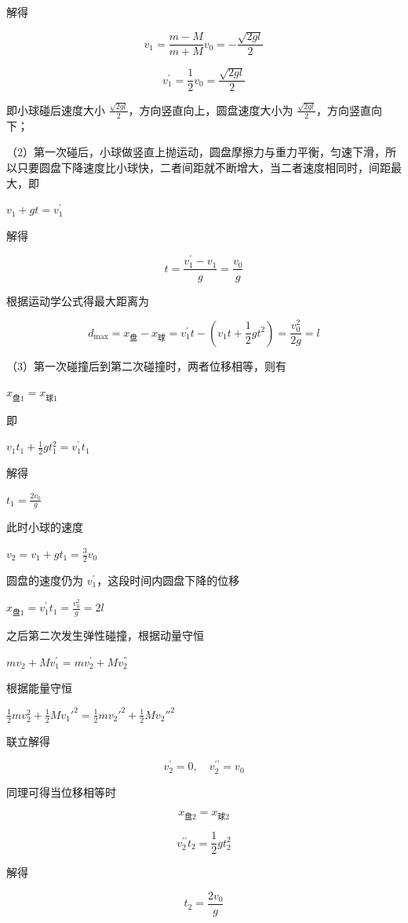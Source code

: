 \documentclass[\gkver]{gaokaozhenti}
\begin{document}
\begin{enumerate}
{解得

$$ v_{1}=\frac{m-M}{m+M}v_{0}=-\frac{\sqrt{2gl}}{2} $$

$$ v_{1}^{\prime}=\frac{1}{2}v_{0}=\frac{\sqrt{2gl}}{2} $$

即小球碰后速度大小  $\frac{\sqrt{2gl}}{2}$，方向竖直向上，圆盘速度大小为  $\frac{\sqrt{2gl}}{2}$，方向竖直向下；

（2）第一次碰后，小球做竖直上抛运动，圆盘摩擦力与重力平衡，匀速下滑，所以只要圆盘下降速度比小球快，二者间距就不断增大，当二者速度相同时，间距最大，即

 $v_{1} + gt = v_{1}^{'}$

解得

$$ t=\frac{v_{1}^{\prime}-v_{1}}{g}=\frac{v_{0}}{g} $$

根据运动学公式得最大距离为

$$ d_{\max}=x_{ \text{盘} }-x_{ \text{球} }=v_{1}^{\prime}t-\left(v_{1}t+\frac{1}{2}gt^{2}\right)=\frac{v_{0}^{2}}{2g}=l $$

（3）第一次碰撞后到第二次碰撞时，两者位移相等，则有

 $x_{\text{盘}1}=x_{\text{球}1}$

即

 $v_{1}t_{1}+\frac{1}{2}gt_{1}^{2}=v_{1}^{'}t_{1}$

解得

 $t_{1}=\frac{2v_{0}}{g}$

此时小球的速度

 $v_{2}=v_{1}+gt_{1}=\frac{3}{2}v_{0}$

圆盘的速度仍为  $v_{1}^{'}$，这段时间内圆盘下降的位移

 $x_{\text{盘}1}=v_{1}^{'}t_{1}=\frac{v_{0}^{2}}{g}=2l$

之后第二次发生弹性碰撞，根据动量守恒

 $mv_{2}+Mv_{1}^{'}=mv_{2}^{'}+Mv_{2}^{''}$

根据能量守恒

 $\frac{1}{2}mv_{2}^{2}+\frac{1}{2}Mv_{1}'^{2}=\frac{1}{2}mv_{2}'^{2}+\frac{1}{2}Mv_{2}''^{2}$

联立解得

$$ v_{2}^{\prime}=0,\quad v_{2}^{\prime\prime}=v_{0} $$

同理可得当位移相等时

$$ x_{ \text{盘} 2}=x_{ \text{球} 2} $$

$$ v_{2}^{\prime \prime}t_{2}=\frac{1}{2}gt_{2}^{2} $$

解得

$$ t_{2}=\frac{2v_{0}}{g} $$

}
\end{enumerate}
\end{document}
